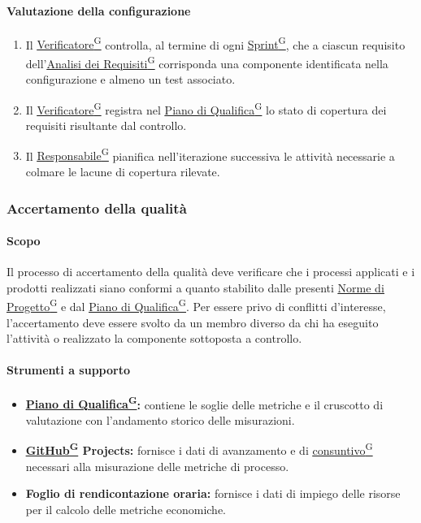 \documentclass[a4paper,12pt]{article}
\providecommand{\glslink}[2]{\href{https://alittlebyte-19.github.io/Documentazione/glossario.html\#gls-#1}{\underline{#2}\textsuperscript{\scriptsize G}}}
\begin{document}
\paragraph{Valutazione della configurazione}
\begin{enumerate}
    \item Il \glslink{verificatore}{Verificatore} controlla, al termine di ogni \glslink{sprint}{Sprint}, che a ciascun requisito dell'\glslink{analisi-dei-requisiti-adr}{Analisi dei Requisiti} corrisponda una componente identificata nella configurazione e almeno un test associato.
    \item Il \glslink{verificatore}{Verificatore} registra nel \glslink{piano-di-qualifica}{Piano di Qualifica} lo stato di copertura dei requisiti risultante dal controllo.
    \item Il \glslink{responsabile}{Responsabile} pianifica nell'iterazione successiva le attività necessarie a colmare le lacune di copertura rilevate.
\end{enumerate}

\subsubsection{Accertamento della qualità}

\paragraph{Scopo}
Il processo di accertamento della qualità deve verificare che i processi applicati e i prodotti realizzati siano conformi a quanto stabilito dalle presenti \glslink{norme-di-progetto}{Norme di Progetto} e dal \glslink{piano-di-qualifica}{Piano di Qualifica}. Per essere privo di conflitti d'interesse, l'accertamento deve essere svolto da un membro diverso da chi ha eseguito l'attività o realizzato la componente sottoposta a controllo.

\paragraph{Strumenti a supporto}
\begin{itemize}
    \item \textbf{\glslink{piano-di-qualifica}{Piano di Qualifica}:} contiene le soglie delle metriche e il cruscotto di valutazione con l'andamento storico delle misurazioni.
    \item \textbf{\glslink{github}{GitHub} Projects:} fornisce i dati di avanzamento e di \glslink{consuntivo}{consuntivo} necessari alla misurazione delle metriche di processo.
    \item \textbf{Foglio di rendicontazione oraria:} fornisce i dati di impiego delle risorse per il calcolo delle metriche economiche.
\end{itemize}
\end{document}
